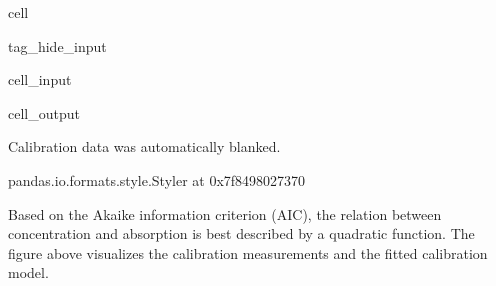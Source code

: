 \documentclass[letterpaper,10pt,english]{jupyterBook}
\begin{document}
\begin{sphinxuseclass}{cell}
\begin{sphinxuseclass}{tag_hide_input}\begin{sphinxVerbatimInput}

\begin{sphinxuseclass}{cell_input}
\begin{sphinxVerbatim}[commandchars=\\\{\}]
  
    
\end{sphinxVerbatim}

\end{sphinxuseclass}\end{sphinxVerbatimInput}
\begin{sphinxVerbatimOutput}

\begin{sphinxuseclass}{cell_output}
\begin{sphinxVerbatim}[commandchars=\\\{\}]
Calibration data was automatically blanked.
\end{sphinxVerbatim}

\begin{sphinxVerbatim}[commandchars=\\\{\}]
\PYGZlt{}pandas.io.formats.style.Styler at 0x7f8498027370\PYGZgt{}
\end{sphinxVerbatim}

\noindent{}

\end{sphinxuseclass}\end{sphinxVerbatimOutput}

\end{sphinxuseclass}
\end{sphinxuseclass}
\sphinxAtStartPar
Based on the Akaike information criterion (AIC), the relation between concentration and absorption is best described by a quadratic function. The figure above visualizes the calibration measurements and the fitted calibration model.
\end{document}
